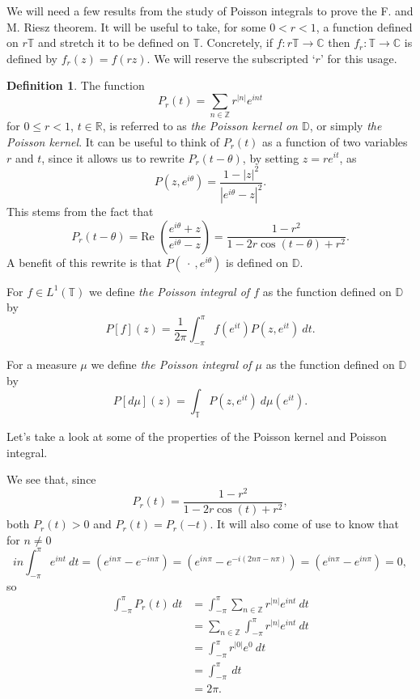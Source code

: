 \documentclass[a4paper,12pt,twoside,BCOR=10mm]{scrbook}
\theoremstyle{definition}
\theoremstyle{definition}
\theoremstyle{definition}
\newtheorem{definition}[theorem]{Definition}
\renewcommand{\Re}{\text{Re }}
\begin{document}
We will need a few results from the study of Poisson integrals to prove the F. and M. Riesz theorem.
\label{index22}
It will be useful to take, for some $0 < r < 1$, a function defined on $r\mathbb{T}$ and stretch it to be defined on $\mathbb{T}$.
Concretely, if $f: r\mathbb{T} \rightarrow \mathbb{C}$ then $f_r: \mathbb{T} \rightarrow \mathbb{C}$ is defined by $f_r(z) = f(rz)$.
We will reserve the subscripted `$r$' for this usage.
\begin{definition}
\label{index21}
The function
\[
	P_r(t) = \sum_{n \in \mathbb{Z}} r^{|n|}e^{int}
\]
for $0 \leq r < 1$, $t \in \mathbb{R}$, is referred to as \emph{the Poisson kernel on $\mathbb{D}$}, or simply \emph{the Poisson kernel}.
It can be useful to think of $P_r(t)$ as a function of two variables $r$ and $t$, since it allows us to rewrite $P_r(t - \theta)$, by setting $z = re^{it}$, as
\[
	P(z, e^{i\theta}) = \frac{1 - |z|^2}{|e^{i\theta} - z|^2}.
\]
This stems from the fact that
\[
	P_r(t - \theta) = \Re \left ( \frac{e^{i\theta} + z}{e^{i\theta} - z}\right ) = \frac{1 - r^2}{1 - 2r\cos(t - \theta) + r^2}.
\]
A benefit of this rewrite is that $P(\ \cdot\ , e^{i\theta})$ is defined on $\mathbb{D}$.

For $f \in L^1(\mathbb{T})$ we define \emph{the Poisson integral of $f$} as the function defined on $\mathbb{D}$ by
\[
	P[f](z) = \frac{1}{2\pi} \int_{-\pi}^{\pi} f(e^{it})P(z, e^{it})\ dt.
\]

For a measure $\mu$ we define \emph{the Poisson integral of $\mu$} as the function defined on $\mathbb{D}$ by
\[
	P[d\mu](z) = \int_{\mathbb{T}} P(z, e^{it})\ d\mu(e^{it}).
\]

Let's take a look at some of the properties of the Poisson kernel and Poisson integral.
\end{definition}
We see that, since
\[
	P_r(t) = \frac{1 - r^2}{1 - 2r\cos(t) + r^2},
\]
both $P_r(t) > 0$ and $P_r(t) = P_r(-t)$.
It will also come of use to know that for $n \neq 0$
\[
	in\int_{-\pi}^{\pi} e^{int}\ dt
	= (e^{in\pi} - e^{-in\pi})
	= (e^{in\pi} - e^{-i(2n\pi - n\pi)})
	= (e^{in\pi} - e^{in\pi})
	= 0,
\]
so
\begin{align*}
	\int_{-\pi}^{\pi} P_r(t)\ dt
	&= \int_{-\pi}^{\pi} \sum_{n \in \mathbb{Z}} r^{|n|}e^{int}\ dt\\
	&= \sum_{n \in \mathbb{Z}} \int_{-\pi}^{\pi} r^{|n|}e^{int}\ dt\\
	&= \int_{-\pi}^{\pi} r^{|0|}e^{0}\ dt\\
	&= \int_{-\pi}^{\pi}\ dt\\
	&= 2\pi.
\end{align*}
\end{document}
